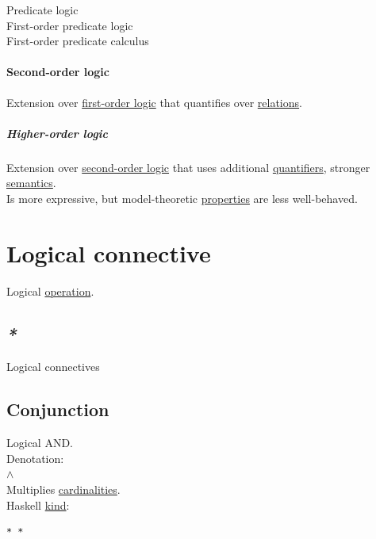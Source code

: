 \documentclass[a4paper,14pt,oneside]{book}
\begin{document}
{\label{org5e96718}Predicate logic\\
\label{orgc5c2664}First-order predicate logic\\
\label{orgf30409c}First-order predicate calculus\\

\paragraph{\label{orgbecaebd}Second-order logic}
\label{sec:org56a2b38}
Extension over \hyperref[orgbdb19a6]{first-order logic} that quantifies over \hyperref[org7713e01]{relations}.\\

\subparagraph{\label{org7aad51c}Higher-order logic}
\label{sec:org3366d45}
Extension over \hyperref[orgbecaebd]{second-order logic} that uses additional \hyperref[org52e2af2]{quantifiers}, stronger \hyperref[orgcecfd32]{semantics}.\\

Is more expressive, but model-theoretic \hyperref[org5fc06ca]{properties} are less well-behaved.\\

\section{\label{org8f4a952}Logical connective}
\label{sec:orge2e5971}
Logical \hyperref[org4cee8d5]{operation}.\\

\subsection{\emph{*}}
\label{sec:orgca9d5a6}

\label{org886ee26}Logical connectives\\

\subsection{\label{org272d3cb}Conjunction}
\label{sec:org3b0bfa0}
Logical AND.\\

Denotation:\\
\(\land\)\\

Multiplies \hyperref[orgf89f526]{cardinalities}.\\

Haskell \hyperref[org3e1a79e]{kind}:\\
\begin{verbatim}
* *
\end{verbatim}

}
\end{document}
